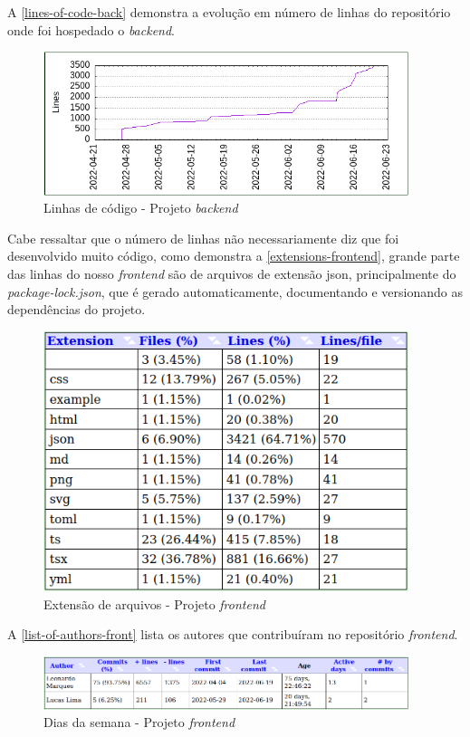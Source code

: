 A \autoref{lines-of-code-back} demonstra a evolução em número de linhas do repositório onde foi hospedado o \textit{\gls{backend}}.
\begin{figure}[H]
	\centering
	\caption{\label{lines-of-code-back}Linhas de código - Projeto \textit{\gls{backend}}}
	\includegraphics[width=0.95\textwidth]{../imagens/stats/lines-of-code-backend.png}
\end{figure}

Cabe ressaltar que o número de linhas não necessariamente diz que foi desenvolvido muito código, como demonstra a \autoref{extensions-frontend}, grande parte das linhas do nosso \textit{\gls{frontend}} são de arquivos de extensão \ac{json}, principalmente do \textit{package-lock.json}, que é gerado automaticamente, documentando e versionando as dependências do projeto.
\begin{figure}[H]
	\centering
	\caption{\label{extensions-frontend}Extensão de arquivos - Projeto \textit{\gls{frontend}}}
	\includegraphics[width=0.95\textwidth]{../imagens/stats/extensions-frontend.png}
\end{figure}

A \autoref{list-of-authors-front} lista os autores que contribuíram no repositório \textit{\gls{frontend}}.
\begin{figure}[H]
	\centering
	\caption{\label{list-of-authors-front}Dias da semana - Projeto \textit{\gls{frontend}}}
	\includegraphics[width=0.95\textwidth]{../imagens/stats/list-of-authors-frontend.png}
\end{figure}

